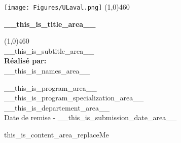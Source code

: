 \documentclass{article}
\begin{document}
\begin{titlepage}
  \begin{center}
  \texttt{[image: Figures/ULaval.png]}
  \line(1,0){460}\\
  
  \begin{large}
  \Large{\textbf{__this_is_title_area__}}
  \\
  \end{large}
  \line(1,0){460}\\
  [1.5cm]
  \Large{__this_is_subtitle_area__}\\ 
  [1.5cm]
  \Large{\textbf{Réalisé par:}}\\
  __this_is_names_area__
  
  \vspace{1cm}
  \Large{__this_is_program_area__}\\
  __this_is_program_specialization_area__ \\
  [5cm]
  __this_is_departement_area__\\
  Date de remise - __this_is_submission_date_area__
  \end{center} 
  \end{titlepage}

\newpage
  \tableofcontents
\newpage

\thispagestyle{plain}


this_is_content_area_replaceMe
\end{document}
